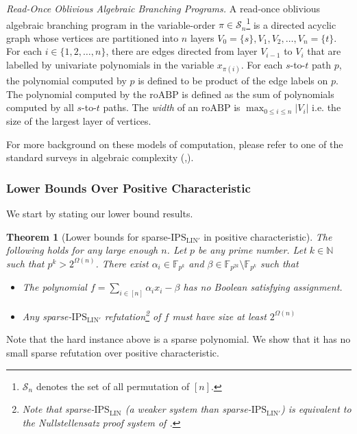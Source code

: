 \documentclass[11pt]{article}
\newtheorem{theorem}{Theorem}[section]
\newcommand{\F}{\mathbb{F}}
\newcommand{\IPSLIN}{\mathrm{IPS}_{\mathrm{LIN}}}
\newcommand{\IPSLINp}{\mathrm{IPS}_{\mathrm{LIN}'}}
\newcommand{\roABP}{\mathrm{roABP}}
\begin{document}
\textit{Read-Once Oblivious Algebraic Branching Programs.}
A read-once oblivious algebraic branching program in the variable-order $\pi \in \mathcal{S}_n$\footnote{$\mathcal{S}_n$ denotes the set of all permutation of $[n]$.} is a directed acyclic graph whose vertices are partitioned into $n$ layers $V_0 = \{s\}, V_1, V_2, \dots, V_n = \{t\}$. For each $i \in \{1, 2, \dots, n\}$, there are edges directed from layer $V_{i-1}$ to $V_{i}$ that are labelled by univariate polynomials in the variable $x_{\pi(i)}$. For each $s$-to-$t$ path $p$, the polynomial computed by $p$ is defined to be product of the edge labels on $p$. The polynomial computed by the $\roABP$ is defined as the sum of polynomials computed by all $s$-to-$t$ paths. The \emph{width} of an $\roABP$ is $\max_{0\leq i \leq n} |V_i|$ i.e. the size of the largest layer of vertices. 


For more background on these models of computation, please refer to one of the standard surveys in algebraic complexity (\cite{SY10},\cite{saptharishisurvey}).

\subsubsection{Lower Bounds Over Positive Characteristic}
\label{sec:intro-lower}

We start by stating our lower bound results. 

\begin{theorem}[Lower bounds for sparse-$\IPSLINp$ in positive characteristic]
    \label{thm:lbd-sparse}
    The following holds for any large enough $n$. Let $p$ be any prime number. Let $k \in \mathbb{N}$ such that $p^k > 2^{\Omega(n)}$. There exist $\alpha_{i}\in \F_{p^{k}}$ and $\beta \in \F_{p^{{{2k}}}}\setminus \F_{p^{k}}$ such that 
    \begin{itemize}
        \item The polynomial $f = \sum_{i \in [n]}\alpha_{i} x_i - \beta$ has no Boolean satisfying assignment.
        \item Any sparse-$\IPSLINp$ refutation\footnote{Note that sparse-$\IPSLIN$ (a weaker system than sparse-$\IPSLINp$) is equivalent to the Nullstellensatz proof system of \cite{BIKPP94}.} of $f$ must have size at least $2^{\Omega(n)}$ 
    \end{itemize}
\end{theorem}
Note that the hard instance above is a sparse polynomial. We show that it has no small sparse refutation over positive characteristic. 
\end{document}
